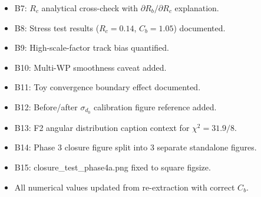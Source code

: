 \documentclass[11pt,a4paper]{article}
\begin{document}
\begin{itemize}
\item B7: $R_c$ analytical cross-check with $\partial R_b / \partial R_c$ explanation.
\item B8: Stress test results ($R_c = 0.14$, $C_b = 1.05$) documented.
\item B9: High-scale-factor track bias quantified.
\item B10: Multi-WP smoothness caveat added.
\item B11: Toy convergence boundary effect documented.
\item B12: Before/after $\sigma_{d_0}$ calibration figure reference added.
\item B13: F2 angular distribution caption context for $\chi^2 = 31.9/8$.
\item B14: Phase 3 closure figure split into 3 separate standalone figures.
\item B15: closure\_test\_phase4a.png fixed to square figsize.
\item All numerical values updated from re-extraction with correct $C_b$.
\end{itemize}
\end{document}
